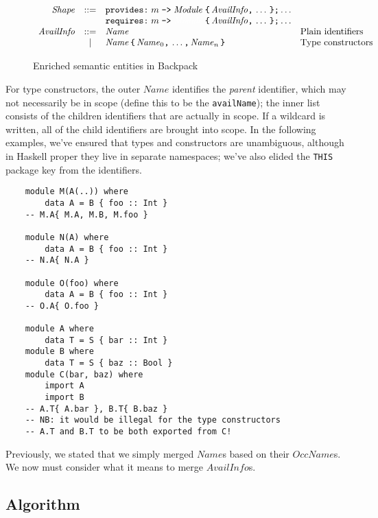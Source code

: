 \documentclass{article}
\newcommand{\I}[1]{\ensuremath{\mathit{#1}}}
\begin{document}
\begin{figure}[htpb]
$$
\begin{array}{rcll}
\I{Shape} & ::= & \verb|provides:|\; m \; \verb|->|\; \I{Module}\; \verb|{|\, \I{AvailInfo} \verb|,|\, \ldots \, \verb|};| \ldots \\
      &     & \verb|requires:| \; m \; \verb|->|\; \textcolor{white}{\I{Module}}\; \verb|{| \, \I{AvailInfo} \verb|,| \, \ldots \, \verb|}| \verb|;| \ldots \\
\I{AvailInfo} & ::= & \I{Name} & \mbox{Plain identifiers} \\
          & |   & \I{Name} \, \verb|{| \, \I{Name}_0\verb|,| \, \ldots\verb|,| \, \I{Name}_n \, \verb|}| & \mbox{Type constructors} \\
\end{array}
$$
\caption{Enriched semantic entities in Backpack} \label{fig:semantic2}
\end{figure}
%
For type constructors, the outer \I{Name} identifies the \emph{parent}
identifier, which may not necessarily be in scope (define this to be the \texttt{availName}); the inner list consists
of the children identifiers that are actually in scope.  If a wildcard
is written, all of the child identifiers are brought into scope.
In the following examples, we've ensured that
types and constructors are unambiguous, although in Haskell proper they
live in separate namespaces; we've also elided the \verb|THIS| package
key from the identifiers.

\begin{verbatim}
    module M(A(..)) where
        data A = B { foo :: Int }
    -- M.A{ M.A, M.B, M.foo }

    module N(A) where
        data A = B { foo :: Int }
    -- N.A{ N.A }

    module O(foo) where
        data A = B { foo :: Int }
    -- O.A{ O.foo }

    module A where
        data T = S { bar :: Int }
    module B where
        data T = S { baz :: Bool }
    module C(bar, baz) where
        import A
        import B
    -- A.T{ A.bar }, B.T{ B.baz }
    -- NB: it would be illegal for the type constructors
    -- A.T and B.T to be both exported from C!
\end{verbatim}
%
Previously, we stated that we simply merged \I{Name}s based on their
\I{OccName}s.  We now must consider what it means to merge \I{AvailInfo}s.

\subsection{Algorithm}
\end{document}
